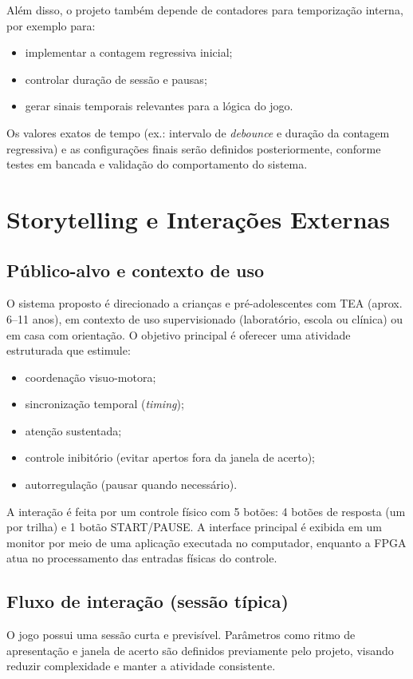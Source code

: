 \documentclass[a4paper,12pt,twoside]{article}
\begin{document}
Além disso, o projeto também depende de contadores para temporização interna, por exemplo para:

\begin{itemize}
    \item implementar a contagem regressiva inicial;
    \item controlar duração de sessão e pausas;
    \item gerar sinais temporais relevantes para a lógica do jogo.
\end{itemize}

Os valores exatos de tempo (ex.: intervalo de \emph{debounce} e duração da contagem regressiva) e as configurações finais serão definidos posteriormente, conforme testes em bancada e validação do comportamento do sistema.

\section{Storytelling e Interações Externas}

\subsection{Público-alvo e contexto de uso}
O sistema proposto é direcionado a crianças e pré-adolescentes com TEA (aprox. 6--11 anos), em contexto de uso supervisionado (laboratório, escola ou clínica) ou em casa com orientação. O objetivo principal é oferecer uma atividade estruturada que estimule:

\begin{itemize}
    \item coordenação visuo-motora;
    \item sincronização temporal (\emph{timing});
    \item atenção sustentada;
    \item controle inibitório (evitar apertos fora da janela de acerto);
    \item autorregulação (pausar quando necessário).
\end{itemize}

A interação é feita por um controle físico com 5 botões: 4 botões de resposta (um por trilha) e 1 botão START/PAUSE. A interface principal é exibida em um monitor por meio de uma aplicação executada no computador, enquanto a FPGA atua no processamento das entradas físicas do controle.

\subsection{Fluxo de interação (sessão típica)}
O jogo possui uma sessão curta e previsível. Parâmetros como ritmo de apresentação e janela de acerto são definidos previamente pelo projeto, visando reduzir complexidade e manter a atividade consistente.
\end{document}
